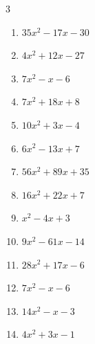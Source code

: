 \begin{multicols}{3}
\begin{enumerate}
  \item $35x^{2}-17x-30$

        \phantom{$=(5x-6)(7x+5)$}

  \item $4x^{2}+12x-27$

        \phantom{$=(2x+9)(2x-3)$}

  \item $7x^{2}-x-6$

        \phantom{$=(x-1)(7x+6)$}

  \item $7x^{2}+18x+8$

        \phantom{$=(x+2)(7x+4)$}

  \item $10x^{2}+3x-4$

        \phantom{$=(2x-1)(5x+4)$}

\columnbreak %

\resetques

  \item $6x^{2}-13x+7$

        \phantom{$=(6x-7)(x-1)$}

  \item $56x^{2}+89x+35$

        \phantom{$=(7x+5)(8x+7)$}

  \item $16x^{2}+22x+7$

        \phantom{$=(2x+1)(8x+7)$}

  \item $x^{2}-4x+3$

        \phantom{$=(x-3)(x-1)$}

  \item $9x^{2}-61x-14$

        \phantom{$=(x-7)(9x+2)$}

  \item $28x^{2}+17x-6$

        \phantom{$=(4x-1)(7x+6)$}

  \item $7x^{2}-x-6$

        \phantom{$=(7x+6)(x-1)$}

  \item $14x^{2}-x-3$

        \phantom{$=(7x+3)(2x-1)$}

  \item $4x^{2}+3x-1$

        \phantom{$=(x+1)(4x-1)$}


\end{enumerate}
\end{multicols}
